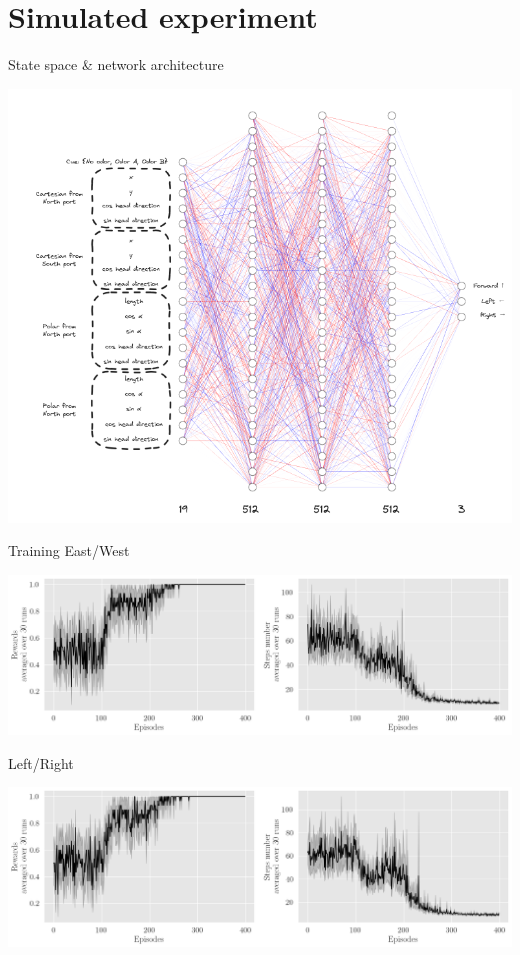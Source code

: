 \documentclass[bigger]{beamer}
\begin{document}
\section{Simulated experiment}
\label{sec:org910751d}
\begin{frame}[label={sec:org5339384}]{State space \& network architecture}
\begin{center}
\includegraphics[height=0.97\textheight]{medias/state-space-nn.png}
\end{center}
\end{frame}
\begin{frame}[label={sec:org91c2488}]{Training}
East/West
\begin{center}
\includegraphics[height=0.35\textheight]{medias/steps-and-rewards-EastWest.png}
\end{center}
Left/Right
\begin{center}
\includegraphics[height=0.35\textheight]{medias/steps-and-rewards-LeftRight.png}
\end{center}
\end{frame}
\end{document}
